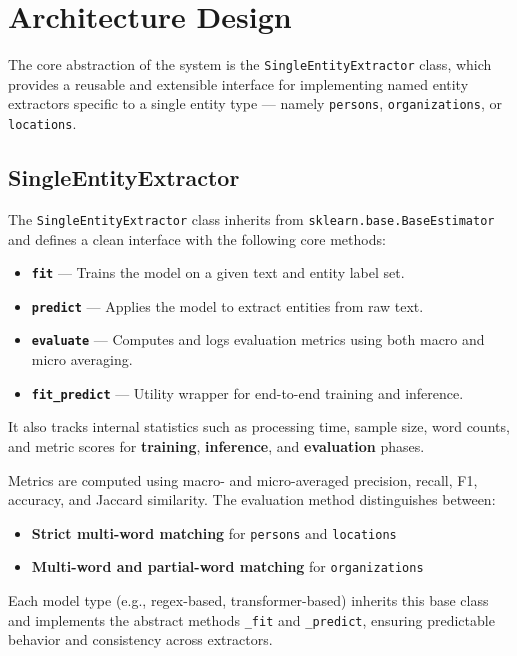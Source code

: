 \section{Architecture Design}

The core abstraction of the system is the \texttt{SingleEntityExtractor} class, which provides a reusable and extensible interface for implementing named entity extractors specific to a single entity type — namely \texttt{persons}, \texttt{organizations}, or \texttt{locations}.

\subsection{SingleEntityExtractor}

The \texttt{SingleEntityExtractor} class inherits from \texttt{sklearn.base.BaseEstimator} and defines a clean interface with the following core methods:

\begin{itemize}
  \item \textbf{\texttt{fit}} — Trains the model on a given text and entity label set.
  \item \textbf{\texttt{predict}} — Applies the model to extract entities from raw text.
  \item \textbf{\texttt{evaluate}} — Computes and logs evaluation metrics using both macro and micro averaging.
  \item \textbf{\texttt{fit\_predict}} — Utility wrapper for end-to-end training and inference.
\end{itemize}

It also tracks internal statistics such as processing time, sample size, word counts, and metric scores for \textbf{training}, \textbf{inference}, and \textbf{evaluation} phases.

Metrics are computed using macro- and micro-averaged precision, recall, F1, accuracy, and Jaccard similarity. The evaluation method distinguishes between:
\begin{itemize}
  \item \textbf{Strict multi-word matching} for \texttt{persons} and \texttt{locations}
  \item \textbf{Multi-word and partial-word matching} for \texttt{organizations}
\end{itemize}

Each model type (e.g., regex-based, transformer-based) inherits this base class and implements the abstract methods \texttt{\_fit} and \texttt{\_predict}, ensuring predictable behavior and consistency across extractors.

